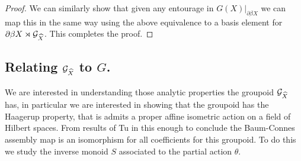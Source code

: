 \begin{proof}
We can similarly show that given any entourage in $G(X)|_{\partial\beta X}$ we can map this in the same way using the above equivalence to a basis element for $\partial\beta X\rtimes \mathcal{G}_{\widehat{X}}$. This completes the proof. \end{proof}

\subsection{Relating $\mathcal{G}_{\widehat{X}}$ to $G$.}

We are interested in understanding those analytic properties the groupoid $\mathcal{G}_{\widehat{X}}$ has, in particular we are interested in showing that the groupoid has the Haagerup property, that is admits a proper affine isometric action on a field of Hilbert spaces. From results of Tu in \cite{MR1703305} this enough to conclude the Baum-Connes assembly map is an isomorphism for all coefficients for this groupoid. To do this we study the inverse monoid $S$ associated to the partial action $\theta$.

